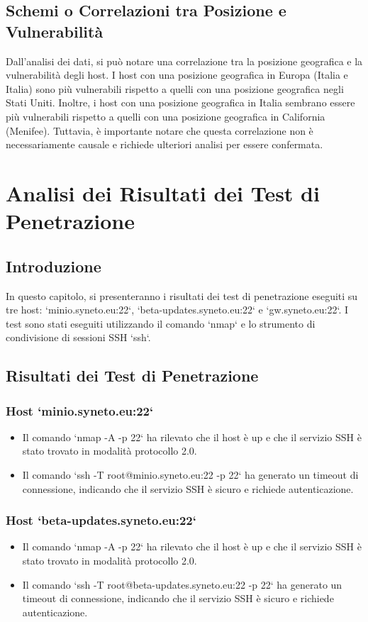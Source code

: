 \section{Schemi o Correlazioni tra Posizione e Vulnerabilità}

Dall'analisi dei dati, si può notare una correlazione tra la posizione geografica e la vulnerabilità degli host. I host con una posizione geografica in Europa (Italia e Italia) sono più vulnerabili rispetto a quelli con una posizione geografica negli Stati Uniti. Inoltre, i host con una posizione geografica in Italia sembrano essere più vulnerabili rispetto a quelli con una posizione geografica in California (Menifee). Tuttavia, è importante notare che questa correlazione non è necessariamente causale e richiede ulteriori analisi per essere confermata.

\chapter{Analisi dei Risultati dei Test di Penetrazione}

\section{Introduzione}

In questo capitolo, si presenteranno i risultati dei test di penetrazione eseguiti su tre host: `minio.syneto.eu:22`, `beta-updates.syneto.eu:22` e `gw.syneto.eu:22`. I test sono stati eseguiti utilizzando il comando `nmap` e lo strumento di condivisione di sessioni SSH `ssh`.

\section{Risultati dei Test di Penetrazione}

\subsection{Host `minio.syneto.eu:22`}
\begin{itemize}
\item Il comando `nmap -A -p 22` ha rilevato che il host è up e che il servizio SSH è stato trovato in modalità protocollo 2.0.
\item Il comando `ssh -T root@minio.syneto.eu:22 -p 22` ha generato un timeout di connessione, indicando che il servizio SSH è sicuro e richiede autenticazione.
\end{itemize}
\subsection{Host `beta-updates.syneto.eu:22`}
\begin{itemize}
\item Il comando `nmap -A -p 22` ha rilevato che il host è up e che il servizio SSH è stato trovato in modalità protocollo 2.0.
\item Il comando `ssh -T root@beta-updates.syneto.eu:22 -p 22` ha generato un timeout di connessione, indicando che il servizio SSH è sicuro e richiede autenticazione.
\end{itemize}
